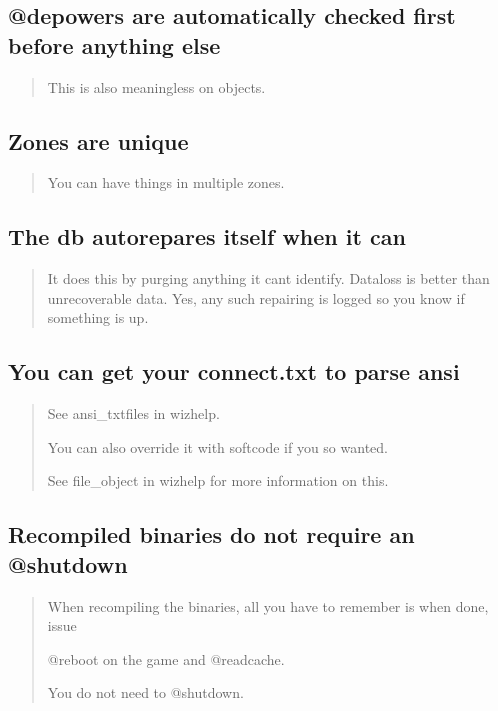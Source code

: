 \documentclass[letterpaper,10pt,english]{sphinxmanual}
\begin{document}
\subsection{@depowers are automatically checked first before anything else}
\label{\detokenize{features:depowers-are-automatically-checked-first-before-anything-else}}\begin{quote}

\sphinxAtStartPar
This is also meaningless on objects.
\end{quote}


\subsection{Zones are unique}
\label{\detokenize{features:zones-are-unique}}\begin{quote}

\sphinxAtStartPar
You can have things in multiple zones.
\end{quote}


\subsection{The db auto\sphinxhyphen{}repares itself when it can}
\label{\detokenize{features:the-db-auto-repares-itself-when-it-can}}\begin{quote}

\sphinxAtStartPar
It does this by purging anything
it can\textquotesingle{}t identify.  Dataloss is better than unrecoverable data.
Yes, any such \textquotesingle{}repairing\textquotesingle{} is logged so you know if something is up.
\end{quote}


\subsection{You can get your connect.txt to parse ansi}
\label{\detokenize{features:you-can-get-your-connect-txt-to-parse-ansi}}\begin{quote}

\sphinxAtStartPar
See ansi\_txtfiles in wizhelp.

\sphinxAtStartPar
You can also override it with softcode if you so wanted.

\sphinxAtStartPar
See file\_object in wizhelp for more information on this.
\end{quote}


\subsection{Re\sphinxhyphen{}compiled binaries do not require an @shutdown}
\label{\detokenize{features:re-compiled-binaries-do-not-require-an-shutdown}}\begin{quote}

\sphinxAtStartPar
When re\sphinxhyphen{}compiling the binaries, all you have to remember is when done, issue

\sphinxAtStartPar
@reboot on the game and @readcache.

\sphinxAtStartPar
You do not need to @shutdown.
\end{quote}
\end{document}
